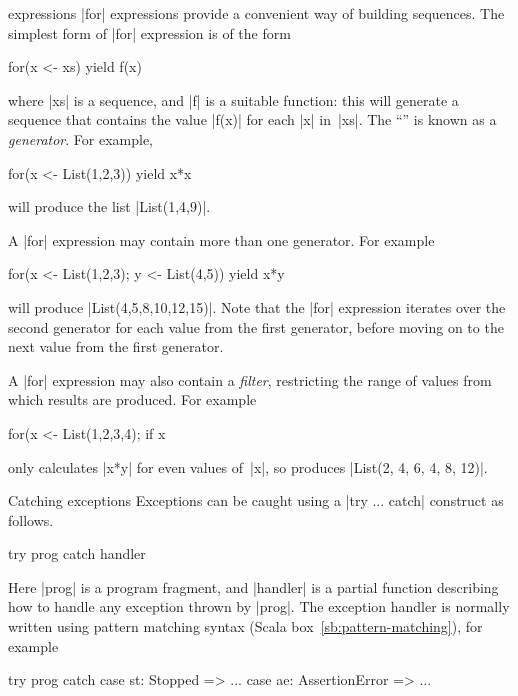 
\begin{scalaBox}{\protect{} expressions}
\label{sb:for-expressions}
|for| expressions provide a convenient way of building sequences.  The
simplest form of |for| expression is of the form
\begin{scala}
  for(x <- xs) yield f(x)
\end{scala}
where |xs| is a sequence, and |f| is a suitable function: this will generate a
sequence that contains the value |f(x)| for each |x| in~|xs|.  The ``'' is known as a \emph{generator}.  For example, 
\begin{scala}
  for(x <- List(1,2,3)) yield x*x
\end{scala}
will produce the list |List(1,4,9)|.

A |for| expression may contain more than one generator.  For example
\begin{scala}
  for(x <- List(1,2,3); y <- List(4,5)) yield x*y
\end{scala}
will produce |List(4,5,8,10,12,15)|.  Note that the |for| expression iterates
over the second generator for each value from the first generator, before
moving on to the next value from the first generator.

A |for| expression may also contain a \emph{filter}, restricting the range of
values from which results are produced.  For example
\begin{scala}
  for(x <- List(1,2,3,4); if x%
\end{scala}
only calculates |x*y| for even values of~|x|, so produces
|List(2, 4, 6, 4, 8, 12)|.

\end{scalaBox}


\begin{scalaBox}{Catching exceptions}
\label{sb:try-catch}
Exceptions can be caught using a |try ... catch| construct as follows. 
\begin{scala}
try{ prog }catch{ handler }
\end{scala}
%
Here |prog| is a program fragment, and |handler| is a partial function
describing how to handle any exception thrown by |prog|.  The exception
handler is normally written using pattern matching syntax (Scala
box~\ref{sb:pattern-matching}), for example
\begin{scala}
  try{ prog } catch{
    case st: Stopped => ...
    case ae: AssertionError => ...
  }
\end{scala}
\end{scalaBox}
